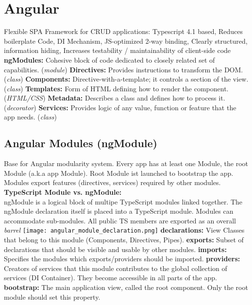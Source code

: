 
\section{Angular}
Flexible SPA Framework for CRUD applications: Typescript 4.1 based, Reduces boilerplate Code, DI Mechanism, JS-optimized 2-way binding, Clearly structured, information hiding, Increases testability / maintainability of client-side code\\
\textcolor{b}{\textbf{ngModules:}} Cohesive block of code dedicated to closely related set of capabilities. (\textit{module})
\textcolor{b}{\textbf{Directives:}} Provides instructions to transform the DOM. (\textit{class})
\textcolor{b}{\textbf{Components:}} Directive-with-a-template; it controls a section of the view. (\textit{class})
\textcolor{b}{\textbf{Templates:}} Form of HTML defining how to render the component. (\textit{HTML/CSS})
\textcolor{b}{\textbf{Metadata:}} Describes a class and defines how to process it. (\textit{decorator})
\textcolor{b}{\textbf{Services:}} Provides logic of any value, function or feature that the app needs. (\textit{class})
\subsection{Angular Modules (ngModule)}
Base for Angular modularity system. Every app has at least one Module, the root Module (a.k.a app Module). Root Module ist launched to bootstrap the app. Modules export features (directives, services) required by other modules.\\
\textcolor{b}{\textbf{TypeScript Module vs. ngModule:}}\\
ngModule is a logical block of multipe TypeScript modules linked together. The ngModule declaration itself is placed into a TypeScript module. Modules can accommodate sub-modules. All public TS members are exported as an overall \textit{barrel}
\texttt{[image: angular\_module\_declaration.png]}
\textbf{declarations:} View Classes that belong to this module (Components, Directives, Pipes). \textbf{exports:} Subset of declarations that should be visible and usable by other modules. \textbf{imports:} Specifies the modules which exports/providers should be imported. \textbf{providers:} Creators of services that this module contributes to the global collection of services (DI Container). They become accessible in all parts of the app. \textbf{bootstrap:} The main application view, called the root component. Only the root module should set this property.
